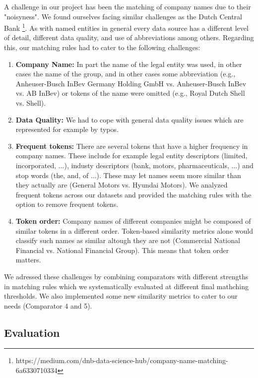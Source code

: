 \documentclass[11pt,titlepage,oneside,openany]{book}
\begin{document}
A challenge in our project has been the matching of company names due to their "noisyness". We found ourselves facing similar challenges as the Dutch Central Bank \footnote{https://medium.com/dnb-data-science-hub/company-name-matching-6a6330710334}. %
As with named entities in general every data source has a different level of detail, different data quality, and use of abbreviations among others. Regarding this, our matching rules had to cater to the following challenges:
\begin{enumerate}
	\item \textbf{Company Name:} In part the name of the legal entity was used, in other cases the name of the group, and in other cases some abbreviation (e.g., Anheuser-Busch InBev Germany Holding GmbH vs. Anheuser-Busch InBev vs. AB InBev) or tokens of the name were omitted (e.g., Royal Dutch Shell vs. Shell).
	\item \textbf{Data Quality:} We had to cope with general data quality issues which are represented for example by typos.
	\item \textbf{Frequent tokens:} There are several tokens that have a higher frequency in company names. These include for example legal entity descriptors (limited, incorporated, ...), industy descriptors (bank, motors, pharmaceuticals, ...) and stop words (the, and, of ...). These may let names seem more similar than they actually are (General Motors vs. Hyundai Motors). We analyzed frequent tokens across our datasets and provided the matching rules with the option to remove frequent tokens.
	\item \textbf{Token order:} Company names of different companies might be composed of similar tokens in a different order. Token-based similarity metrics alone would classify such names as similar altough they are not (Commercial National Financial vs. National Financial Group). This means that token order matters.
\end{enumerate}

We adressed these challenges by combining comparators with different strengths in matching rules which we systematically evaluated at different final mathching thresholds. We also implemented some new similarity metrics to cater to our needs (Comparator 4 and 5).

\subsection{Evaluation}
\end{document}
